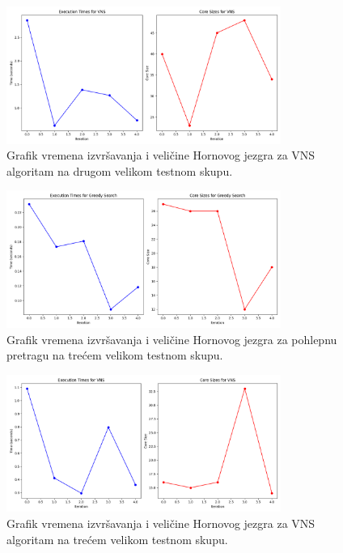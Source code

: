 \documentclass[12pt,oneside]{memoir}
\begin{document}
\begin{figure}[H]
    \centering
    \includegraphics[width=0.8\textwidth]{test2_vns_performance.png}
    \caption{Grafik vremena izvršavanja i veličine Hornovog jezgra za VNS algoritam na drugom velikom testnom skupu.}
    \label{fig:test2_vns_performance}
\end{figure}

\begin{figure}[H]
    \centering
    \includegraphics[width=0.8\textwidth]{test3_greedy_performance.png}
    \caption{Grafik vremena izvršavanja i veličine Hornovog jezgra za pohlepnu pretragu na trećem velikom testnom skupu.}
    \label{fig:test3_greedy_performance}
\end{figure}

\begin{figure}[H]
    \centering
    \includegraphics[width=0.8\textwidth]{test3_vns_performance.png}
    \caption{Grafik vremena izvršavanja i veličine Hornovog jezgra za VNS algoritam na trećem velikom testnom skupu.}
    \label{fig:test3_vns_performance}
\end{figure}
\end{document}
